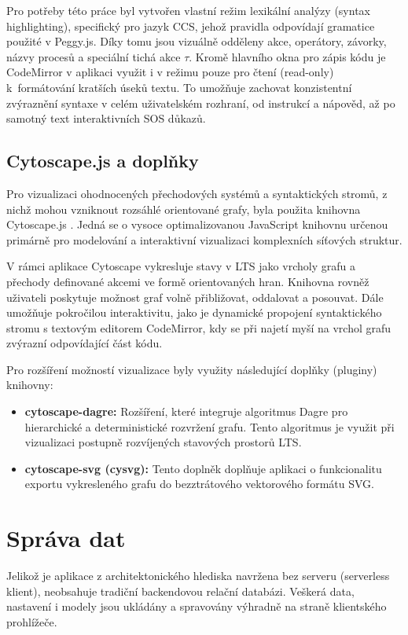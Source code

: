 Pro potřeby této práce byl vytvořen vlastní režim lexikální analýzy (syntax highlighting), specifický pro jazyk CCS, jehož pravidla odpovídají gramatice použité v Peggy.js. 
Díky tomu jsou vizuálně odděleny akce, operátory, závorky, názvy procesů a speciální tichá akce $\tau$. 
Kromě hlavního okna pro zápis kódu je CodeMirror v aplikaci využit i v režimu pouze pro čtení (read-only) k~formátování kratších úseků textu. 
To umožňuje zachovat konzistentní zvýraznění syntaxe v celém uživatelském rozhraní, od instrukcí a nápověd, až po samotný text interaktivních SOS důkazů.

\subsection{Cytoscape.js a doplňky}
Pro vizualizaci ohodnocených přechodových systémů a syntaktických stromů, z nichž mohou vzniknout rozsáhlé orientované grafy, byla použita knihovna Cytoscape.js \cite{keiichiroono_2019_cytoscape}. 
Jedná se o vysoce optimalizovanou JavaScript knihovnu určenou primárně pro modelování a interaktivní vizualizaci komplexních síťových struktur.

V rámci aplikace Cytoscape vykresluje stavy v LTS jako vrcholy grafu a přechody definované akcemi ve formě orientovaných hran. 
Knihovna rovněž uživateli poskytuje možnost graf volně přibližovat, oddalovat a posouvat. 
Dále umožňuje pokročilou interaktivitu, jako je dynamické propojení syntaktického stromu s textovým editorem CodeMirror, kdy se při najetí myší na vrchol grafu zvýrazní odpovídající část kódu. 

Pro rozšíření možností vizualizace byly využity následující doplňky (pluginy) knihovny:
\begin{itemize}
    \item \textbf{cytoscape-dagre:} Rozšíření, které integruje algoritmus Dagre pro hierarchické a deterministické rozvržení grafu. Tento algoritmus je využit při vizualizaci postupně rozvíjených stavových prostorů LTS.
    \item \textbf{cytoscape-svg (cysvg):} Tento doplněk doplňuje aplikaci o funkcionalitu exportu vykresleného grafu do bezztrátového vektorového formátu SVG.
\end{itemize}

\section{Správa dat}
Jelikož je aplikace z architektonického hlediska navržena bez serveru (serverless klient), neobsahuje tradiční backendovou relační databázi. 
Veškerá data, nastavení i modely jsou ukládány a spravovány výhradně na straně klientského prohlížeče.

